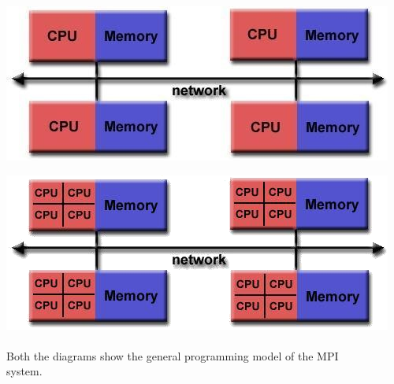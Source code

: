 \documentclass[a4paper,12pt]{article}
\begin{document}
		\includegraphics{MPI_01}

		  
		\includegraphics{MPI_02}
		\\
		\\
		Both the diagrams show the general programming model of the 
		MPI \\ system.
		
		
\end{document}
